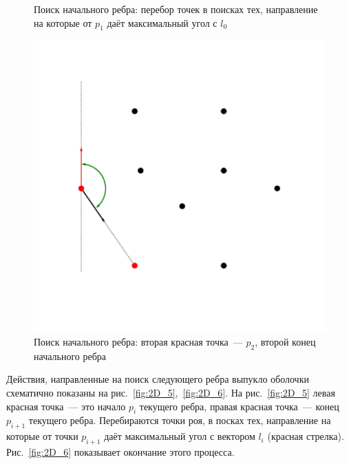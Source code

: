 \documentclass[14pt]{extarticle}
\begin{document}
\begin{figure}[t]
\begin{minipage}{0.4\textwidth}
    \vspace*{-7ex}

    \caption{Поиск начального ребра: перебор точек в поисках тех, направление на которые от $p_1$ даёт максимальный угол с $l_0$}
    \label{fig:2D_3}
  \end{minipage}
  \hfill
  \begin{minipage}{0.4\textwidth}
    \centering

    \hspace*{-0.1\textwidth}\includegraphics[width=1.25\textwidth]{gift4.pdf}

    \vspace*{-7ex}

    \caption{Поиск начального ребра: вторая красная точка~--- $p_2$, второй конец начального ребра~}
    \label{fig:2D_4}
  \end{minipage}
  \hfill{}
\end{figure}

Действия, направленные на поиск следующего ребра выпукло оболочки схематично показаны на рис.~\ref{fig:2D_5},~\ref{fig:2D_6}. На рис.~\ref{fig:2D_5} левая красная точка~--- это начало $p_i$ текущего ребра, правая красная точка~--- конец $p_{i+1}$ текущего ребра. Перебираются точки роя, в посках тех, направление на которые от точки $p_{i+1}$ даёт максимальный угол с вектором $l_i$ (красная стрелка). Рис.~\ref{fig:2D_6} показывает окончание этого процесса.
\end{document}
